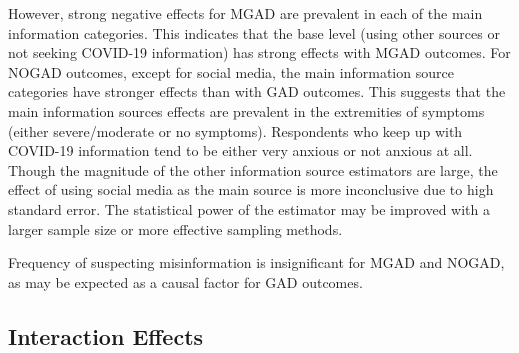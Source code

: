 \documentclass{article}[12pt]
\begin{document}
        However, strong negative effects for MGAD are prevalent in each of the main information categories. This indicates that the base level (using other sources or not seeking COVID-19 information) has strong effects with MGAD outcomes. For NOGAD outcomes, except for social media, the main information source categories have stronger effects than with GAD outcomes. This suggests that the main information sources effects are prevalent in the extremities of symptoms (either severe/moderate or no symptoms). Respondents who keep up with COVID-19 information tend to be either very anxious or not anxious at all. Though the magnitude of the other information source estimators are large, the effect of using social media as the main source is more inconclusive due to high standard error. The statistical power of the estimator may be improved with a larger sample size or more effective sampling methods.
        
        Frequency of suspecting misinformation is insignificant for MGAD and NOGAD, as may be expected as a causal factor for GAD outcomes.
        
    \subsection{Interaction Effects}
            
\end{document}
